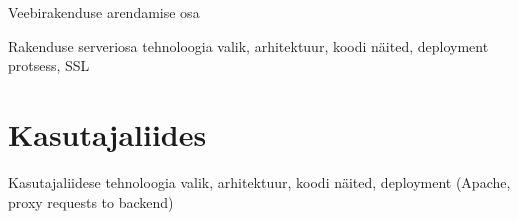Veebirakenduse arendamise osa


Rakenduse serveriosa tehnoloogia valik, arhitektuur, koodi näited, deployment protsess, SSL
\section{Kasutajaliides}
Kasutajaliidese tehnoloogia valik, arhitektuur, koodi näited, deployment (Apache, proxy requests to backend)
